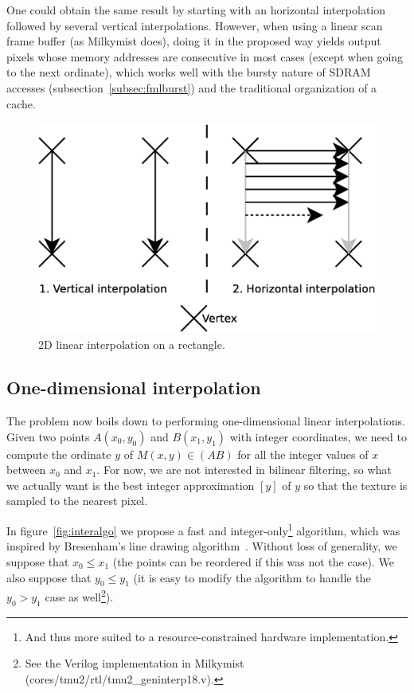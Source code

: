 \documentclass[a4paper,11pt]{kthesis}
\begin{document}
One could obtain the same result by starting with an horizontal interpolation followed by several vertical interpolations. However, when using a linear scan frame buffer (as Milkymist does), doing it in the proposed way yields output pixels whose memory addresses are consecutive in most cases (except when going to the next ordinate), which works well with the bursty nature of SDRAM accesses (subsection~\ref{subsec:fmlburst}) and the traditional organization of a cache.

\begin{figure}[htp]
\centering
\includegraphics[height=70mm]{rectinter.eps}
\caption{2D linear interpolation on a rectangle.}
\label{fig:rectinter}
\end{figure}

\subsection{One-dimensional interpolation}
The problem now boils down to performing one-dimensional linear interpolations. Given two points $A(x_{0}, y_{0})$ and $B(x_{1}, y_{1})$ with integer coordinates, we need to compute the ordinate $y$ of $M(x, y) \in (AB)$ for all the integer values of $x$ between $x_{0}$ and $x_{1}$. For now, we are not interested in bilinear filtering, so what we actually want is the best integer approximation $[y]$ of $y$ so that the texture is sampled to the nearest pixel.

In figure~\ref{fig:interalgo} we propose a fast and integer-only\footnote{And thus more suited to a resource-constrained hardware implementation.} algorithm, which was inspired by Bresenham's line drawing algorithm~\cite{bresenham}. Without loss of generality, we suppose that $x_{0} \leq x_{1}$ (the points can be reordered if this was not the case). We also suppose that $y_{0} \leq y_{1}$ (it is easy to modify the algorithm to handle the $y_{0} > y_{1}$ case as well\footnote{See the Verilog implementation in Milkymist (cores/tmu2/rtl/tmu2\_geninterp18.v).}).
\end{document}
